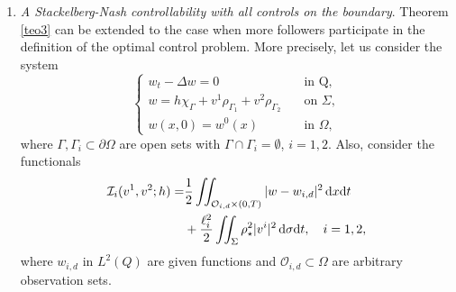 \documentclass{dcds-bOF}
\theoremstyle{definition}
\def\cbd{\Gamma}
\def\dx{\,\textnormal{d}x}
\def\dt{\textnormal{d}t}
\def\d{\,\textnormal{d}}
\begin{document}
\begin{enumerate}
\item \textit{A Stackelberg-Nash controllability with all controls on the boundary}. Theorem \ref{teo3} can be extended to the case when more followers participate in the definition of the optimal control problem. More precisely, let us consider the system
%
\begin{equation}\label{sys_sec3}
\begin{cases}
w_t-\Delta w=0 & \quad \text{in Q}, \\
w=h\chi_{\cbd}+ v^1\rho_{\Gamma_1}+v^2\rho_{\Gamma_2}&\quad \text{on } \Sigma, \\
w(x,0)=w^0(x) &\quad \text{in } \Omega,
\end{cases}
\end{equation}
%
where $\Gamma,\Gamma_i\subset \partial \Omega$ are open sets with $\Gamma\cap\Gamma_i=\emptyset$, $i=1,2$. Also, consider the functionals
%
\begin{equation}\label{func_nash}
\begin{split}
\mathcal I_i(v^1,v^2;h)=&\frac{1}{2}\iint_{\mathcal O_{i,d}\times(0,T)}|w-w_{i,d}|^2\dx\dt\\
&+\frac{\ell_i^2}{2}\iint_{\Sigma}\rho_\star^2|v^{i}|^2\d\sigma\dt, \quad i=1,2,
\end{split}
\end{equation}
%
where $w_{i,d}$ in $L^2(Q)$ are given functions and $\mathcal{O}_{i,d}\subset \Omega$ are arbitrary observation sets.


\end{enumerate}
\end{document}
